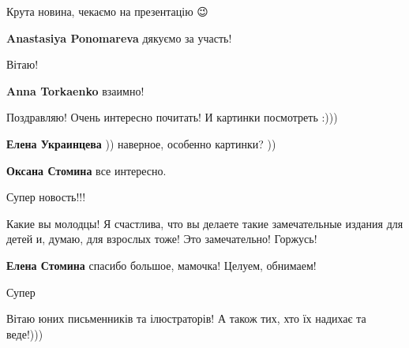 
Крута новина, чекаємо на презентацію 😉

\begin{itemize} %
\textbf{Anastasiya Ponomareva} дякуємо за участь! 🙂
\end{itemize} %


Вітаю!

\begin{itemize} %
\textbf{Anna Torkaenko} взаимно! 
\end{itemize} %


Поздравляю! Очень интересно почитать! И картинки посмотреть :)))

\begin{itemize} %
\textbf{Елена Украинцева} )) наверное, особенно картинки? ))

\textbf{Оксана Стомина} все интересно.
\end{itemize} %


Супер новость!!!


Какие вы молодцы! Я счастлива, что вы делаете такие замечательные издания для
детей и, думаю, для взрослых тоже! Это замечательно! Горжусь!

\begin{itemize} %
\textbf{Елена Стомина} спасибо большое, мамочка! Целуем, обнимаем! 🙂
\end{itemize} %


Супер


Вітаю юних письменників та ілюстраторів! А також тих, хто їх надихає та
веде!)))
